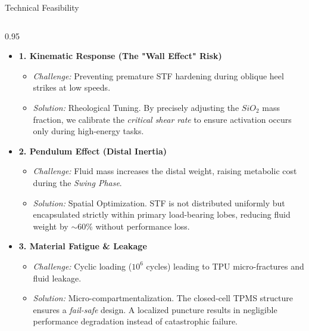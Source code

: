 \begin{frame}{Technical Feasibility}
    \begin{columns}[T]
        \begin{column}{0.95\textwidth}
            \small
            \begin{itemize}
                \item \textbf{1. Kinematic Response (The "Wall Effect" Risk)}
                \begin{itemize}
                    \item \textit{Challenge:} Preventing premature STF hardening during oblique heel strikes at low speeds.
                    \item \textit{Solution:} \alert{Rheological Tuning}. By precisely adjusting the $SiO_2$ mass fraction, we calibrate the \textit{critical shear rate} to ensure activation occurs only during high-energy tasks.
                \end{itemize}
                
                \vspace{0.4cm}
                
                \item \textbf{2. Pendulum Effect (Distal Inertia)}
                \begin{itemize}
                    \item \textit{Challenge:} Fluid mass increases the distal weight, raising metabolic cost during the \textit{Swing Phase}.
                    \item \textit{Solution:} \alert{Spatial Optimization}. STF is not distributed uniformly but encapsulated strictly within primary load-bearing lobes, reducing fluid weight by $\sim$60\% without performance loss.
                \end{itemize}
                
                \vspace{0.4cm}
                
                \item \textbf{3. Material Fatigue \& Leakage}
                \begin{itemize}
                    \item \textit{Challenge:} Cyclic loading ($10^6$ cycles) leading to TPU micro-fractures and fluid leakage.
                    \item \textit{Solution:} \alert{Micro-compartmentalization}. The closed-cell TPMS structure ensures a \textit{fail-safe} design. A localized puncture results in negligible performance degradation instead of catastrophic failure.
                \end{itemize}
            \end{itemize}
        \end{column}
    \end{columns}
\end{frame}